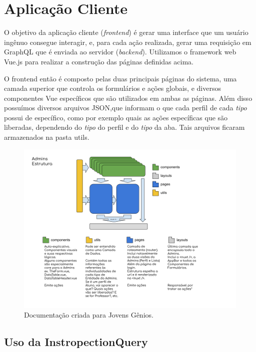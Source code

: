 \section{Aplicação Cliente}

O objetivo da aplicação cliente (\textit{frontend}) é gerar uma interface que um usuário ingênuo consegue interagir, e, para cada ação realizada, gerar uma requisição em GraphQL que é enviada ao servidor (\textit{backend}). Utilizamos o framework web Vue.js para realizar a construção das páginas definidas acima.

O frontend então é composto pelas duas principais páginas do sistema, uma camada superior que controla os formulários e ações globais, e diversos componentes Vue específicos que são utilizados em ambas as páginas. Além disso possuímos diversos arquivos JSON,que informam o que cada perfil de cada \textit{tipo} possui de específico, como por exemplo quais as ações específicas que são liberadas, dependendo do \textit{tipo} do perfil e do \textit{tipo} da aba. Tais arquivos ficaram armazenados na pasta utils.

\begin{figure}[H]
    \centering
    \includegraphics[width=1.0\linewidth]{Imagens/chap04/front-estrutura.png}
    \caption{Documentação criada para Jovens Gênios.}
    \label{fig:front-estrutura}
\end{figure}
    
\subsection{Uso da InstropectionQuery}

